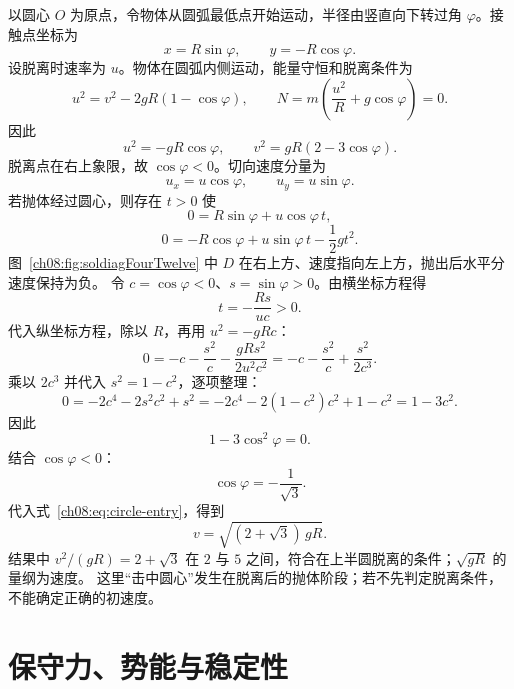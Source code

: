 {\begin{xesolution}
以圆心 $O$ 为原点，令物体从圆弧最低点开始运动，半径由竖直向下转过角
$\varphi$。接触点坐标为
\[
 x=R\sin\varphi,\qquad y=-R\cos\varphi.
\]
设脱离时速率为 $u$。物体在圆弧内侧运动，能量守恒和脱离条件为
\[
 u^2=v^2-2gR(1-\cos\varphi),
\qquad
 N=m\left(\frac{u^2}{R}+g\cos\varphi\right)=0.
\]
因此
\begin{equation}
 u^2=-gR\cos\varphi,\qquad v^2=gR(2-3\cos\varphi).
 \label{ch08:eq:circle-entry}
\end{equation}
脱离点在右上象限，故 $\cos\varphi<0$。切向速度分量为
\[
 u_x=u\cos\varphi,\qquad u_y=u\sin\varphi.
\]
若抛体经过圆心，则存在 $t>0$ 使
\[
 0=R\sin\varphi+u\cos\varphi\,t,
\]
\[
 0=-R\cos\varphi+u\sin\varphi\,t-\frac12gt^2.
\]
\soldiagFourTwelve
图~\ref{ch08:fig:soldiagFourTwelve} 中 $D$ 在右上方、速度指向左上方，抛出后水平分速度保持为负。
令 $c=\cos\varphi<0$、$s=\sin\varphi>0$。由横坐标方程得
\[
 t=-\frac{Rs}{uc}>0.
\]
代入纵坐标方程，除以 $R$，再用 $u^2=-gRc$：
\[
 0=-c-\frac{s^2}{c}-\frac{gRs^2}{2u^2c^2}
   =-c-\frac{s^2}{c}+\frac{s^2}{2c^3}.
\]
乘以 $2c^3$ 并代入 $s^2=1-c^2$，逐项整理：
\[
 0=-2c^4-2s^2c^2+s^2
 =-2c^4-2(1-c^2)c^2+1-c^2=1-3c^2.
\]
因此
\[
 1-3\cos^2\varphi=0.
\]
结合 $\cos\varphi<0$：
\[
 \cos\varphi=-\frac1{\sqrt3}.
\]
代入式~\eqref{ch08:eq:circle-entry}，得到
\[
 \boxed{v=\sqrt{(2+\sqrt3)\,gR}}.
\]
结果中 $v^2/(gR)=2+\sqrt3$ 在 $2$ 与 $5$ 之间，符合在上半圆脱离的条件；$\sqrt{gR}$ 的量纲为速度。
这里“击中圆心”发生在脱离后的抛体阶段；若不先判定脱离条件，不能确定正确的初速度。
\end{xesolution}

\section{保守力、势能与稳定性}

}
